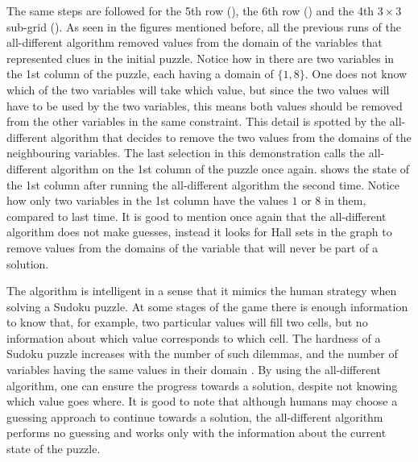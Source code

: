 \documentclass{l4proj}
\begin{document}
\vspace*{-0.5cm}

\noindent The same steps are followed for the 5th row (), the 6th row () and the 4th $3\times 3$ sub-grid (). As seen in the figures mentioned before, all the previous runs of the all-different algorithm removed values from the domain of the variables that represented clues in the initial puzzle. Notice how in  there are two variables in the 1st column of the puzzle, each having a domain of $\{1, 8\}$. One does not know which of the two variables will take which value, but since the two values will have to be used by the two variables, this means both values should be removed from the other variables in the same constraint. This detail is spotted by the all-different algorithm that decides to remove the two values from the domains of the neighbouring variables. The last selection in this demonstration calls the all-different algorithm on the 1st column of the puzzle once again.  shows the state of the 1st column after running the all-different algorithm the second time. Notice how only two variables in the 1st column have the values $1$ or $8$ in them, compared to last time. It is good to mention once again that the all-different algorithm does not make guesses, instead it looks for Hall sets \cite{gent2008generalised} in the graph to remove values from the domains of the variable that will never be part of a solution.

\noindent The algorithm is intelligent in a sense that it mimics the human strategy when solving a Sudoku puzzle. At some stages of the game there is enough information to know that, for example, two particular values will fill two cells, but no information about which value corresponds to which cell. The hardness of a Sudoku puzzle increases with the number of such dilemmas, and the number of variables having the same values in their domain \cite{gomes2002completing}. By using the all-different algorithm, one can ensure the progress towards a solution, despite not knowing which value goes where. It is good to note that although humans may choose a guessing approach to continue towards a solution, the all-different algorithm performs no guessing and works only with the information about the current state of the puzzle.
\end{document}

